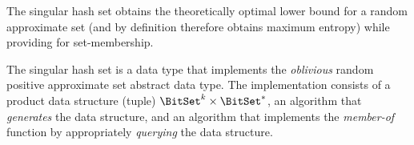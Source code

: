 \documentclass[ ../main.tex]{subfiles}
\begin{document}
The singular hash set obtains the theoretically optimal lower bound for a random approximate set (and by definition therefore obtains maximum entropy) while providing for set-membership.

The singular hash set is a data type that implements the \emph{oblivious} random 
positive approximate set abstract data type.
The implementation consists of a  product data structure (tuple) $\BitSet^k \times \BitSet^{*}$, an algorithm 
that \emph{generates} the data structure, and an algorithm that implements the \emph{member-of} function by appropriately \emph{querying} the data structure.


%
%
\end{document}

